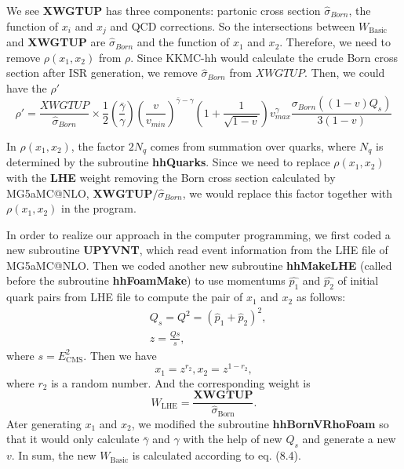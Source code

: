  We see \textbf{XWGTUP} has three components: partonic cross section $\hat{\sigma}_{Born}$, the function of $x_i$ and $x_j$ and QCD corrections. So the intersections between $W_\text{Basic}$ and \textbf{XWGTUP} are $\hat{\sigma}_{Born}$ and the function of $x_1$ and $x_2$. Therefore,  we need to remove $\rho(x_1,x_2)$  from $\rho$. Since KKMC-hh would calculate the crude Born cross section after ISR generation, we remove $\hat{\sigma}_{Born}$ from $XWGTUP$. Then, we could have the $\rho'$
 \begin{equation}
 \rho' = \frac{XWGTUP}{\hat{\sigma}_{Born}} \times \frac{1}{2} (\frac{\bar{\gamma}}{
 	\gamma}) (\frac{v}{v_{min}})^{\bar{\gamma}-\gamma} (1+\frac{1}{\sqrt{1-v}})v_{max}^{\gamma} \frac{ \sigma_{Born}((1-v)Q_s)}{3(1-v)}
 \end{equation} 
 
 In $\rho(x_1,x_2)$, the factor $2N_q$ comes from summation over quarks, where $N_q$ is determined by the subroutine \textbf{hh\textunderscore Quarks}. Since we need to replace $\rho(x_1,x_2)$ with the \textbf{LHE} weight removing the Born cross section calculated by MG5\textunderscore aMC@NLO, $\textbf{XWGTUP}/\hat{\sigma}_{Born}$, we would replace this factor together with $\rho(x_1,x_2)$ in the program.
 
 In order to realize our approach in the computer programming, we first coded a new subroutine \textbf{UPYVNT}, which read event information from the LHE file of MG5\textunderscore aMC@NLO. Then we coded another new subroutine  \textbf{hh\textunderscore MakeLHE} (called before the subroutine \textbf{hhFoam\textunderscore Make}) to use momentums $\hat{p_1}$ and $\hat{p_2}$ of initial quark pairs from LHE file to compute the pair of $x_1$ and $x_2$ as follows:
\begin{align}
&Q_s =Q^2 = (\hat{p}_1+\hat{p}_2)^2,\nonumber\\
&z=\frac{Qs}{s}, 
 \end{align}
where $s=E_\text{CMS}^2$. Then we have
 $$
 x_1 = z^{r_2}, x_2 = z^{1-r_2},
 $$
 where $r_2$ is a random number. And the corresponding weight is
 $$
W_\text{LHE} = \frac{\textbf{XWGTUP}}{\hat{\sigma}_\text{Born}}.
 $$
 Ater generating $x_1$ and $x_2$, we modified the subroutine \textbf{hhBornV\textunderscore RhoFoam} so that it would only calculate $\bar{\gamma}$ and $\gamma$ with the help of new $Q_s$ and generate a new $v$. In sum, the new $W_\text{Basic}$ is calculated according to eq. (8.4). 
 
